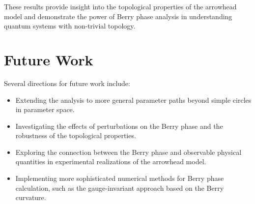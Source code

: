 \documentclass[12pt,a4paper]{article}
\begin{document}
These results provide insight into the topological properties of the arrowhead model and demonstrate the power of Berry phase analysis in understanding quantum systems with non-trivial topology.




\section{Future Work}

Several directions for future work include:
\begin{itemize}
    \item Extending the analysis to more general parameter paths beyond simple circles in parameter space.
    \item Investigating the effects of perturbations on the Berry phase and the robustness of the topological properties.
    \item Exploring the connection between the Berry phase and observable physical quantities in experimental realizations of the arrowhead model.
    \item Implementing more sophisticated numerical methods for Berry phase calculation, such as the gauge-invariant approach based on the Berry curvature.
\end{itemize}
\end{document}
